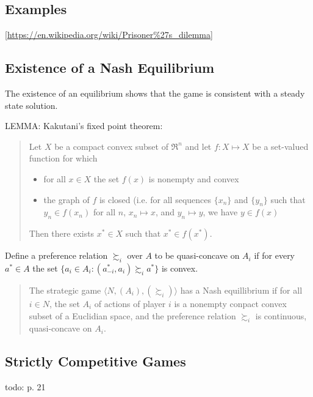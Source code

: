 \subsection{Examples}

[\url{https://en.wikipedia.org/wiki/Prisoner\%27s_dilemma}]

\subsection{Existence of a Nash Equilibrium}

The existence of an equilibrium shows that the game is consistent with a
steady state solution.

LEMMA: Kakutani's fixed point theorem: 
\begin{quote}
Let $X$ be a compact convex subset
of $\Re^n$ and let $f:X\mapsto X$ be a set-valued function for which
	\begin{itemize}
		\item for all $x\in X$ the set $f(x)$ is nonempty and convex
		\item the graph of $f$ is closed (i.e. for all sequences $\{x_n\}$
			and $\{y_n\}$ such that $y_n\in f(x_n)$ for all $n$,
			$x_n\mapsto x$, and $y_n \mapsto y$, we have $y\in f(x)$
	\end{itemize}
	Then there exists $x^*\in X$ such that $x^* \in f(x^*)$.
\end{quote}

Define a preference relation $\succsim_i$ over $A$ to be quasi-concave on
$A_i$ if for every $a^*\in A$ the set
$\{a_i\in A_i:(a^*_{-i},a_i)\succsim_i a^*\}$ is convex.
\begin{quote}
	The strategic game $\langle N, (A_i), (\succsim_i)\rangle$ has a Nash
	equillibrium if for all $i \in N$, the set $A_i$ of actions of player
	$i$ is a nonempty conpact convex subset of a Euclidian space, and the
	preference relation $\succsim_i$ is continuous, quasi-concave on $A_i$.
\end{quote}

\subsection{Strictly Competitive Games}

todo: p. 21

